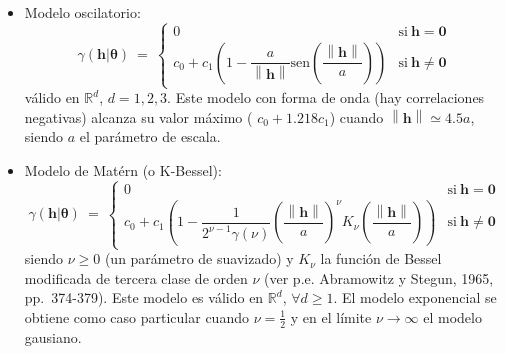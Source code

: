 \documentclass[
  spanish,
]{book}
\theoremstyle{break}
\theoremstyle{definition}
\theoremstyle{definition}
\theoremstyle{definition}
\theoremstyle{definition}
\theoremstyle{remark}
\begin{document}
\begin{itemize}
\[\begin{array}{ll}
  0 & \text{si}\  \mathbf{h}=\mathbf{0} \\
  c_{0} + c_1 \left( 1-\exp \left( -3\left( \dfrac{\left\|
  \mathbf{h}\right\| }{a} \right)^{\lambda } \right) \right)  & \text{si}\ 
  \mathbf{h}\neq \mathbf{0}
  \end{array}
  \right.\]
  con \(0\leq \lambda \leq 2\) y válido en \(\mathbb{R}^{d}\), \(\forall d \geq 1\).
  Cuando \(\lambda =2\) es denominado modelo gausiano;
  este modelo sin embargo no debería ser utilizado en la predicción
  espacial debido a las inestabilidades numéricas que produce en los
  algoritmos kriging (especialmente cuando el efecto nugget es grande; ver
  p.e. Wackernagel, 1998, pp.~120-123).
  El modelo exponencial se obtiene también como caso particular cuando \(\lambda =1\).
\item
  Modelo oscilatorio:
  \[\gamma(\mathbf{h}\left| \boldsymbol{\theta}\right. )\ =\ \left\{ 
  \begin{array}{ll}
  0 & \text{si}\  \mathbf{h}=\mathbf{0} \\
  c_{0} + c_1 \left( 1-\dfrac{a}{\left\| \mathbf{h}\right\| }
  \text{sen} \left( \dfrac{\left\| \mathbf{h}\right\| }{a} \right) \right) 
  & \text{si}\  \mathbf{h}\neq \mathbf{0}
  \end{array}
  \right.\]
  válido en \(\mathbb{R}^{d}\), \(d=1,2,3\).
  Este modelo con forma de onda (hay correlaciones negativas) alcanza su valor máximo ( \(c_{0} +1.218c_1\)) cuando \(\left\| \mathbf{h}\right\| \simeq 4.5a\), siendo \(a\) el parámetro de escala.
\item
  Modelo de Matérn (o K-Bessel):
  \[\gamma(\mathbf{h}\left| \boldsymbol{\theta}\right. )\ =\ \left\{ 
  \begin{array}{ll}
  0 & \text{si}\  \mathbf{h}=\mathbf{0} \\
  c_{0} + c_1 \left( 1-\dfrac{1}{2^{\nu -1} \gamma(\nu )} \left(
  \dfrac{\left\| \mathbf{h}\right\| }{a} \right)^{\nu } K_{\nu } \left(
  \dfrac{\left\| \mathbf{h}\right\| }{a} \right) \right)  & \text{si}\ 
  \mathbf{h}\neq \mathbf{0}
  \end{array}
  \right.\]
  siendo \(\nu \geq 0\) (un parámetro de suavizado) y \(K_{\nu }\) la función de Bessel modificada de tercera clase de orden \(\nu\) (ver p.e. Abramowitz y Stegun, 1965, pp.~374-379).
  Este modelo es válido en \(\mathbb{R}^{d}\), \(\forall d \geq 1\). El modelo exponencial se obtiene como caso particular cuando \(\nu =\frac{1}{2}\) y en el límite \(\nu \rightarrow \infty\) el modelo gausiano.
\end{itemize}
\end{document}
